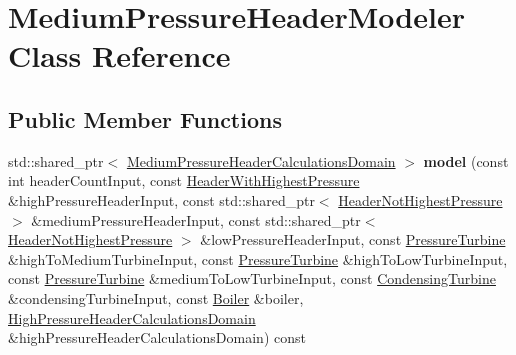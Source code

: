\hypertarget{class_medium_pressure_header_modeler}{}\section{Medium\+Pressure\+Header\+Modeler Class Reference}
\label{class_medium_pressure_header_modeler}
\subsection*{Public Member Functions}
\begin{DoxyCompactItemize}
\item 
\mbox{\label{class_medium_pressure_header_modeler_a961851789548eb62b268bf1e1e47d1d3}} 
std\+::shared\+\_\+ptr$<$ \hyperlink{class_medium_pressure_header_calculations_domain}{Medium\+Pressure\+Header\+Calculations\+Domain} $>$ {\bfseries model} (const int header\+Count\+Input, const \hyperlink{class_header_with_highest_pressure}{Header\+With\+Highest\+Pressure} \&high\+Pressure\+Header\+Input, const std\+::shared\+\_\+ptr$<$ \hyperlink{class_header_not_highest_pressure}{Header\+Not\+Highest\+Pressure} $>$ \&medium\+Pressure\+Header\+Input, const std\+::shared\+\_\+ptr$<$ \hyperlink{class_header_not_highest_pressure}{Header\+Not\+Highest\+Pressure} $>$ \&low\+Pressure\+Header\+Input, const \hyperlink{class_pressure_turbine}{Pressure\+Turbine} \&high\+To\+Medium\+Turbine\+Input, const \hyperlink{class_pressure_turbine}{Pressure\+Turbine} \&high\+To\+Low\+Turbine\+Input, const \hyperlink{class_pressure_turbine}{Pressure\+Turbine} \&medium\+To\+Low\+Turbine\+Input, const \hyperlink{class_condensing_turbine}{Condensing\+Turbine} \&condensing\+Turbine\+Input, const \hyperlink{class_boiler}{Boiler} \&boiler, \hyperlink{class_high_pressure_header_calculations_domain}{High\+Pressure\+Header\+Calculations\+Domain} \&high\+Pressure\+Header\+Calculations\+Domain) const
\item 
\mbox{\label{class_medium_pressure_header_modeler_aaf90331dd5cf8a0fb883be17de477904}} 

\end{DoxyCompactItemize}
